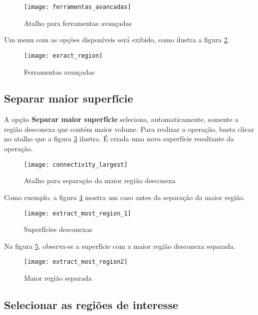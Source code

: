 \begin{figure}[!htb]
\centering
\texttt{[image: ferramentas\_avancadas]}
\caption{Atalho para ferramentas avançadas}
\label{fig:advanced_tools}
\end{figure}

\newpage

Um menu com as opções disponíveis será exibido, como ilustra a figura
\ref{fig:advanced_tools_expanded}.

\begin{figure}[!htb]
\centering
\texttt{[image: exract\_region]}
\caption{Ferramentas avançadas}
\label{fig:advanced_tools_expanded}
\end{figure}

\subsection{Separar maior superfície}

A opção \textbf{Separar maior superfície} seleciona, automaticamente, somente a região
desconexa que contém maior volume. Para realizar a operação, basta clicar no atalho
que a figura \ref{fig:short_connectivity_largest} ilustra. É criada uma nova superfície
resultante da operação.

\begin{figure}[!htb]
\centering
\texttt{[image: connectivity\_largest]}
\caption{Atalho para separação da maior região desconexa}
\label{fig:short_connectivity_largest}
\end{figure}

Como exemplo, a figura \ref{fig:extract_most_region_1} mostra um caso antes da separação
da maior região.

\begin{figure}[!htb]
\centering
\texttt{[image: extract\_most\_region\_1]}
\caption{Superfícies desconexas}
\label{fig:extract_most_region_1}
\end{figure}

Na figura \ref{fig:extract_most_region2}, observa-se a superfície com a maior região
desconexa separada.

\begin{figure}[!htb]
\centering
\texttt{[image: extract\_most\_region2]}
\caption{Maior região separada}
\label{fig:extract_most_region2}
\end{figure}

\newpage

\subsection{Selecionar as regiões de interesse}

